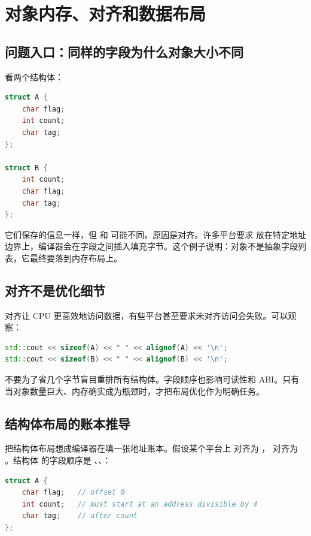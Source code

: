 \chapter{对象内存、对齐和数据布局}

\section{问题入口：同样的字段为什么对象大小不同}

看两个结构体：

\begin{lstlisting}[language=C++,caption={字段顺序影响对象大小}]
struct A {
    char flag;
    int count;
    char tag;
};

struct B {
    int count;
    char flag;
    char tag;
};
\end{lstlisting}

它们保存的信息一样，但  和  可能不同。原因是对齐。许多平台要求  放在特定地址边界上，编译器会在字段之间插入填充字节。这个例子说明：对象不是抽象字段列表，它最终要落到内存布局上。

\section{对齐不是优化细节}

对齐让 CPU 更高效地访问数据，有些平台甚至要求未对齐访问会失败。可以观察：

\begin{lstlisting}[language=C++,caption={观察大小和对齐}]
std::cout << sizeof(A) << " " << alignof(A) << '\n';
std::cout << sizeof(B) << " " << alignof(B) << '\n';
\end{lstlisting}

不要为了省几个字节盲目重排所有结构体。字段顺序也影响可读性和 ABI。只有当对象数量巨大、内存确实成为瓶颈时，才把布局优化作为明确任务。

\section{结构体布局的账本推导}

把结构体布局想成编译器在填一张地址账本。假设某个平台上  对齐为 ， 对齐为 。结构体  的字段顺序是 、、：

\begin{lstlisting}[language=C++,caption={按字段顺序推导布局}]
struct A {
    char flag;   // offset 0
    int count;   // must start at an address divisible by 4
    char tag;    // after count
};
\end{lstlisting}

